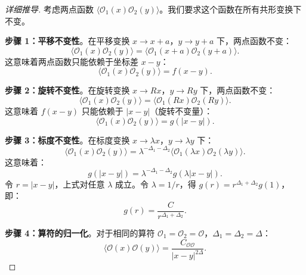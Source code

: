 \begin{proof}[详细推导]
考虑两点函数 $\langle \mathcal{O}_1(x) \mathcal{O}_2(y) \rangle$。我们要求这个函数在所有共形变换下不变。

\textbf{步骤 1：平移不变性}。在平移变换 $x \to x + a$，$y \to y + a$ 下，两点函数不变：
\begin{equation}
    \langle \mathcal{O}_1(x) \mathcal{O}_2(y) \rangle = \langle \mathcal{O}_1(x+a) \mathcal{O}_2(y+a) \rangle.
\end{equation}
这意味着两点函数只能依赖于坐标差 $x - y$：
\begin{equation}
    \langle \mathcal{O}_1(x) \mathcal{O}_2(y) \rangle = f(x - y).
\end{equation}

\textbf{步骤 2：旋转不变性}。在旋转变换 $x \to Rx$，$y \to Ry$ 下，两点函数不变：
\begin{equation}
    \langle \mathcal{O}_1(x) \mathcal{O}_2(y) \rangle = \langle \mathcal{O}_1(Rx) \mathcal{O}_2(Ry) \rangle.
\end{equation}
这意味着 $f(x - y)$ 只能依赖于 $|x - y|$（旋转不变量）：
\begin{equation}
    \langle \mathcal{O}_1(x) \mathcal{O}_2(y) \rangle = g(|x - y|).
\end{equation}

\textbf{步骤 3：标度不变性}。在标度变换 $x \to \lambda x$，$y \to \lambda y$ 下：
\begin{equation}
    \langle \mathcal{O}_1(x) \mathcal{O}_2(y) \rangle = \lambda^{-\Delta_1 - \Delta_2} \langle \mathcal{O}_1(\lambda x) \mathcal{O}_2(\lambda y) \rangle.
\end{equation}
这意味着：
\begin{equation}
    g(|x - y|) = \lambda^{-\Delta_1 - \Delta_2} g(\lambda |x - y|).
\end{equation}
令 $r = |x-y|$，上式对任意 $\lambda$ 成立。令 $\lambda = 1/r$，得 $g(r) = r^{\Delta_1+\Delta_2} g(1)$，即：
\begin{equation}
    g(r) = \frac{C}{r^{\Delta_1 + \Delta_2}}.
\end{equation}

\textbf{步骤 4：算符的归一化}。对于相同的算符 $\mathcal{O}_1 = \mathcal{O}_2 = \mathcal{O}$，$\Delta_1 = \Delta_2 = \Delta$：
\begin{equation}
    \langle \mathcal{O}(x) \mathcal{O}(y) \rangle = \frac{C_{\mathcal{O}\mathcal{O}}}{|x - y|^{2\Delta}}.
\end{equation}
\end{proof}

